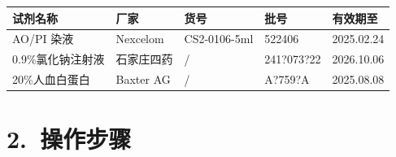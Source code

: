 \documentclass[UTF8,10pt,a4paper,fontset=fandol]{ctexart}
\newcommand{\fieldvalue}[1]{#1}
\newcommand{\handwritten}[1]{#1}
\begin{document}
\begin{center}
\begin{center}
\begin{tabularx}{\textwidth}{|l|l|l|X|X|}
\hline
试剂名称 & 厂家 & 货号 & 批号 & 有效期至\\
\hline
AO/PI 染液 & Nexcelom & CS2-0106-5ml &
\fieldvalue{\handwritten{522406}} &
\fieldvalue{\handwritten{2025.02.24}}\\
\hline
0.9\%氯化钠注射液 & 石家庄四药 & / &
\fieldvalue{\handwritten{241?073?22}} &
\fieldvalue{\handwritten{2026.10.06}}\\
\hline
20\%人血白蛋白 & Baxter AG & / &
\fieldvalue{\handwritten{A?759?A}} &
\fieldvalue{\handwritten{2025.08.08}}\\
\hline
\end{tabularx}

\section*{2.\ 操作步骤}


\end{center}
\end{center}
\end{document}
